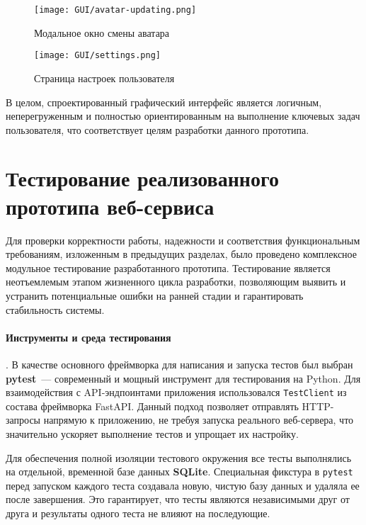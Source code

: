 \begin{figure}[ht]
      \centering
      \texttt{[image: GUI/avatar-updating.png]}
      \caption{Модальное окно смены аватара}
      \label{fig:avatar-updating}
\end{figure}

\begin{figure}[ht]
      \centering
      \texttt{[image: GUI/settings.png]}
      \caption{Страница настроек пользователя}
      \label{fig:settings}
\end{figure}

В целом, спроектированный графический интерфейс является логичным, неперегруженным и полностью
ориентированным на выполнение ключевых задач пользователя, что соответствует целям разработки данного
прототипа.




\section{Тестирование реализованного прототипа веб-сервиса}

Для проверки корректности работы, надежности и соответствия функциональным требованиям, изложенным в
предыдущих разделах, было проведено комплексное модульное тестирование разработанного прототипа.
Тестирование является неотъемлемым этапом жизненного цикла разработки, позволяющим выявить и устранить
потенциальные ошибки на ранней стадии и гарантировать стабильность системы.

\paragraph{Инструменты и среда тестирования}. В качестве основного фреймворка для написания и запуска
тестов был выбран \textbf{pytest}~--- современный и мощный инструмент для тестирования на Python. Для
взаимодействия с API-эндпоинтами приложения использовался \verb|TestClient| из состава фреймворка
FastAPI. Данный подход позволяет отправлять HTTP-запросы напрямую к приложению, не требуя запуска
реального веб-сервера, что значительно ускоряет выполнение тестов и упрощает их настройку.

Для обеспечения полной изоляции тестового окружения все тесты выполнялись на отдельной, временной базе
данных \textbf{SQLite}. Специальная фикстура в \verb|pytest| перед запуском каждого теста создавала
новую, чистую базу данных и удаляла ее после завершения. Это гарантирует, что тесты являются
независимыми друг от друга и результаты одного теста не влияют на последующие.

